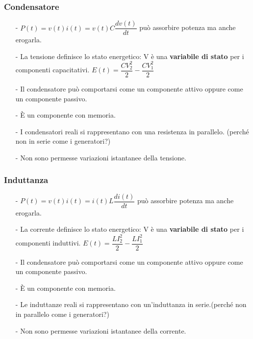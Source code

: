 \documentclass{article}
\begin{document}
\subsubsection{Condensatore}
\medskip
\noindent{}
\begin{itemize}
    \item[-] $P(t)=v(t)i(t)=v(t)C\dfrac{d v(t)}{d t}$ può assorbire potenza ma anche erogarla.
    \item[-] La tensione definisce lo stato energetico: V è una \textbf{variabile di stato} per i componenti capacitativi. $E(t)=\dfrac{CV_2^2}{2} - \dfrac{CV_1^2}{2}$
    \item[-] Il condensatore può comportarsi come un componente attivo oppure come un componente passivo.
    \item[-] È un componente con memoria. 
    \item[-] I condensatori reali si rappresentano con una resistenza in parallelo. (perché non in serie come i generatori?)
    \item[-] Non sono permesse variazioni istantanee della tensione. 
\end{itemize}


\subsubsection{Induttanza}
\medskip
\noindent{}
\begin{itemize}
    \item[-] $P(t)=v(t)i(t)=i(t)L\dfrac{d i(t)}{d t}$ può assorbire potenza ma anche erogarla.
    \item[-] La corrente definisce lo stato energetico: V è una \textbf{variabile di stato} per i componenti induttivi. 
    $E(t)=\dfrac{LI_2^2}{2} - \dfrac{LI_1^2}{2}$
    \item[-] Il condensatore può comportarsi come un componente attivo oppure come un componente passivo.
    \item[-] È un componente con memoria. 
    \item[-] Le induttanze reali si rappresentano con un'induttanza in serie.(perché non in parallelo come i generatori?)
    \item[-] Non sono permesse variazioni istantanee della corrente.
\end{itemize}
\pagebreak
\end{document}
